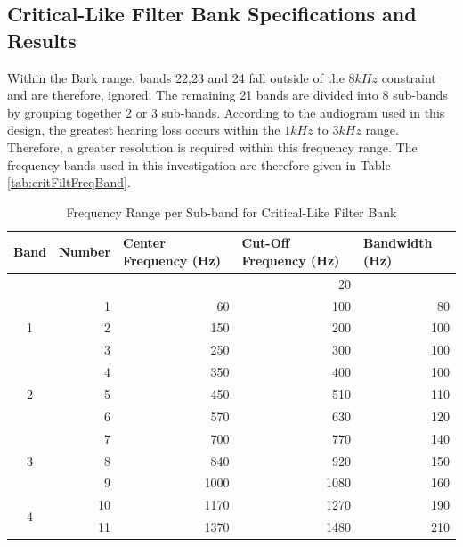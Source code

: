 \documentclass[12pt, onecolumn]{article}
\begin{document}
\begin{appendices}
\section{Critical-Like Filter Bank Specifications and Results}
\label{app:critFiltFreqBand}

\noindent Within the Bark range, bands 22,23 and 24 fall outside of the $8kHz$ constraint and are therefore, ignored. The remaining 21 bands are divided into 8 sub-bands by grouping together 2 or 3 sub-bands. According to the audiogram used in this design, the greatest hearing loss occurs within the $1kHz$ to $3kHz$ range. Therefore, a greater resolution is required within this frequency range. The frequency bands used in this investigation are therefore given in Table \ref{tab:critFiltFreqBand}.

\begin{table}[htbp]
  \centering
  \caption{Frequency Range per Sub-band for Critical-Like Filter Bank}
  \begin{adjustbox}{width=0.9\linewidth}
    \begin{tabular}{|c|r|r|r|r|}
    \hline
    \multicolumn{1}{|l|}{\textbf{Band}} & \multicolumn{1}{l|}{\textbf{Number}} & \multicolumn{1}{l|}{\textbf{Center Frequency (Hz) }} & \multicolumn{1}{l|}{\textbf{Cut-Off Frequency (Hz)}} & \multicolumn{1}{l|}{\textbf{Bandwidth (Hz)}} \\
    \hline
          &       &       & 20    &  \\
    \hline
    \multirow{3}[6]{*}{1} & 1     & 60    & 100   & 80 \\
\cline{2-5}          & 2     & 150   & 200   & 100 \\
\cline{2-5}          & 3     & 250   & 300   & 100 \\
    \hline
    \multirow{3}[6]{*}{2} & 4     & 350   & 400   & 100 \\
\cline{2-5}          & 5     & 450   & 510   & 110 \\
\cline{2-5}          & 6     & 570   & 630   & 120 \\
    \hline
    \multirow{3}[6]{*}{3} & 7     & 700   & 770   & 140 \\
\cline{2-5}          & 8     & 840   & 920   & 150 \\
\cline{2-5}          & 9     & 1000  & 1080  & 160 \\
    \hline
    \multirow{2}[4]{*}{4} & 10    & 1170  & 1270  & 190 \\
\cline{2-5}          & 11    & 1370  & 1480  & 210 \\

\end{tabular}
\end{adjustbox}
\end{table}
\end{appendices}
\end{document}
